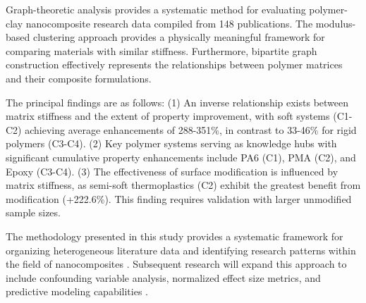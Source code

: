 \documentclass[conference]{IEEEtran}
\begin{document}
Graph-theoretic analysis provides a systematic method for evaluating polymer-clay nanocomposite research data compiled from 148 publications. The modulus-based clustering approach provides a physically meaningful framework for comparing materials with similar stiffness. Furthermore, bipartite graph construction effectively represents the relationships between polymer matrices and their composite formulations.

The principal findings are as follows: (1) An inverse relationship exists between matrix stiffness and the extent of property improvement, with soft systems (C1-C2) achieving average enhancements of 288-351\%, in contrast to 33-46\% for rigid polymers (C3-C4). (2) Key polymer systems serving as knowledge hubs with significant cumulative property enhancements include PA6 (C1), PMA (C2), and Epoxy (C3-C4). (3) The effectiveness of surface modification is influenced by matrix stiffness, as semi-soft thermoplastics (C2) exhibit the greatest benefit from modification (+222.6\%). This finding requires validation with larger unmodified sample sizes.

The methodology presented in this study provides a systematic framework for organizing heterogeneous literature data and identifying research patterns within the field of nanocomposites \cite{68, 91, 112, 127}. Subsequent research will expand this approach to include confounding variable analysis, normalized effect size metrics, and predictive modeling capabilities \cite{8, 22, 79, 116}.
\end{document}
